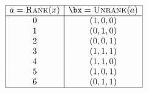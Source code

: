 \begin{table}
$$
\begin{array}{|c|c|}
\hline
a = \mbox{{\sc Rank}}(x) & \bx = \mbox{{\sc Unrank}}(a) \\
\hline
0 & (1,0,0)\\
1 & (0,1,0)\\
2 & (0,0,1)\\
3 & (1,1,1) \\
4 & (1,1,0)\\
5 & (1,0,1)\\
6 & (0,1,1)\\
\hline
\end{array}
$$
\caption{\label{tab:PG22}Representatives of 
the points of $\PG(2,2)$}
\end{table}
